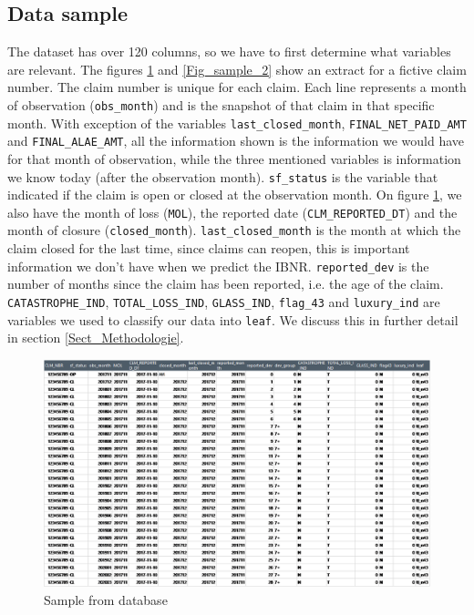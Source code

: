 	\subsection{Data sample}
	The dataset has over 120 columns, so we have to first determine what variables are relevant.  The figures  \ref{Fig_sample_1} and  \ref{Fig_sample_2} show an extract for a fictive claim number. The claim number is unique for each claim. Each line represents a month of observation (\texttt{obs\_month}) and is the snapshot of that claim in that specific month. With exception of the variables \texttt{last\_closed\_month}, \texttt{FINAL\_NET\_PAID\_AMT} and \texttt{FINAL\_ALAE\_AMT}, all the information shown is the information we would have for that month of observation, while the three mentioned variables is information we know today (after the observation month). \texttt{sf\_status} is the variable that indicated if the claim is open or closed at the observation month. On figure \ref{Fig_sample_1}, we also have the month of loss (\texttt{MOL}), the reported date (\texttt{CLM\_REPORTED\_DT}) and the month of closure (\texttt{closed\_month}). \texttt{last\_closed\_month} is the month at which the claim closed for the last time, since claims can reopen, this is important information we don’t have when we predict the IBNR.  \texttt{reported\_dev} is the number of months since the claim has been reported, i.e. the age of the claim. \texttt{CATASTROPHE\_IND}, \texttt{TOTAL\_LOSS\_IND}, \texttt{GLASS\_IND}, \texttt{flag\_43} and \texttt{luxury\_ind} are variables we used to classify our data into \texttt{leaf}. We discuss this in further detail in section \ref{Sect_Methodologie}. 
	
	\begin{figure}[H]
		\begin{center}
			\includegraphics[scale=0.6]{Graphiques/sample_1} 
			\renewcommand{\figurename}{Figure}
			\caption{Sample from database}\label{Fig_sample_1}
		\end{center}
	\end{figure}
	
